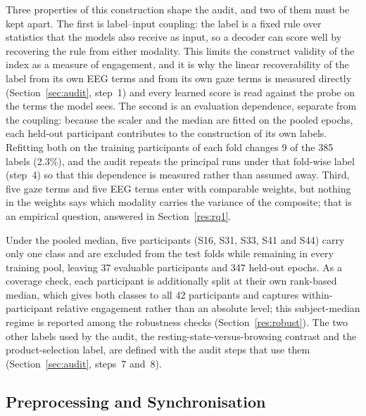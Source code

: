 Three properties of this construction shape the audit, and two of them must be kept apart. The first is label--input coupling: the label is a fixed rule over statistics that the models also receive as input, so a decoder can score well by recovering the rule from either modality. This limits the construct validity of the index as a measure of engagement, and it is why the linear recoverability of the label from its own EEG terms and from its own gaze terms is measured directly (Section~\ref{sec:audit}, step~1) and every learned score is read against the probe on the terms the model sees. The second is an evaluation dependence, separate from the coupling: because the scaler and the median are fitted on the pooled epochs, each held-out participant contributes to the construction of its own labels. Refitting both on the training participants of each fold changes 9 of the 385 labels (2.3\%), and the audit repeats the principal runs under that fold-wise label (step~4) so that this dependence is measured rather than assumed away. Third, five gaze terms and five EEG terms enter with comparable weights, but nothing in the weights says which modality carries the variance of the composite; that is an empirical question, answered in Section~\ref{res:rq1}.

Under the pooled median, five participants (S16, S31, S33, S41 and S44) carry only one class and are excluded from the test folds while remaining in every training pool, leaving 37 evaluable participants and 347 held-out epochs. As a coverage check, each participant is additionally split at their own rank-based median, which gives both classes to all 42 participants and captures within-participant relative engagement rather than an absolute level; this subject-median regime is reported among the robustness checks (Section~\ref{res:robust}). The two other labels used by the audit, the resting-state-versus-browsing contrast and the product-selection label, are defined with the audit steps that use them (Section~\ref{sec:audit}, steps~7 and~8).

\subsection{Preprocessing and Synchronisation}\label{sec:preproc}

